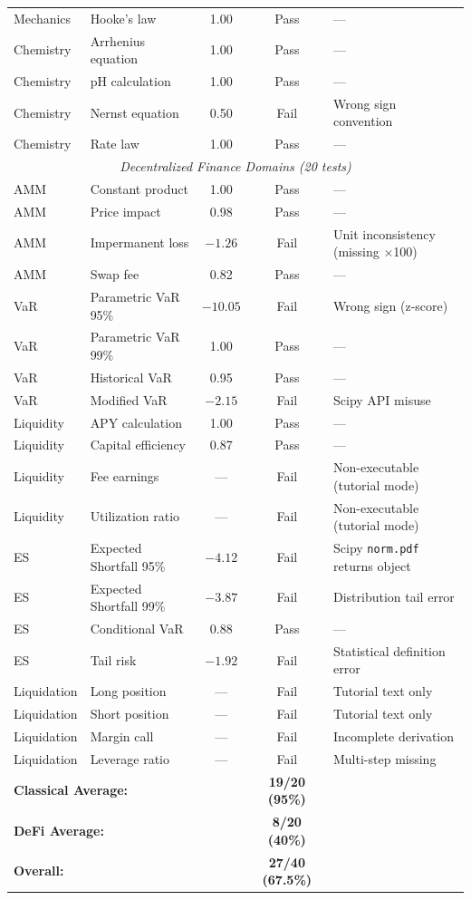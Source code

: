 \documentclass[twoside,11pt]{article}
\begin{document}
\begin{table}[H]
\begin{small}
\begin{tabular}{@{}llccp{5.2cm}@{}}
Mechanics & Hooke's law & 1.00 & Pass & --- \\
Chemistry & Arrhenius equation & 1.00 & Pass & --- \\
Chemistry & pH calculation & 1.00 & Pass & --- \\
Chemistry & Nernst equation & 0.50 & Fail & Wrong sign convention \\
Chemistry & Rate law & 1.00 & Pass & --- \\
\midrule
\multicolumn{5}{c}{\textit{Decentralized Finance Domains (20 tests)}} \\
\midrule
AMM & Constant product & 1.00 & Pass & --- \\
AMM & Price impact & 0.98 & Pass & --- \\
AMM & Impermanent loss & $-1.26$ & Fail & Unit inconsistency (missing $\times$100) \\
AMM & Swap fee & 0.82 & Pass & --- \\
VaR & Parametric VaR 95\% & $-10.05$ & Fail & Wrong sign (z-score) \\
VaR & Parametric VaR 99\% & 1.00 & Pass & --- \\
VaR & Historical VaR & 0.95 & Pass & --- \\
VaR & Modified VaR & $-2.15$ & Fail & Scipy API misuse \\
Liquidity & APY calculation & 1.00 & Pass & --- \\
Liquidity & Capital efficiency & 0.87 & Pass & --- \\
Liquidity & Fee earnings & --- & Fail & Non-executable (tutorial mode) \\
Liquidity & Utilization ratio & --- & Fail & Non-executable (tutorial mode) \\
ES & Expected Shortfall 95\% & $-4.12$ & Fail & Scipy \texttt{norm.pdf} returns object \\
ES & Expected Shortfall 99\% & $-3.87$ & Fail & Distribution tail error \\
ES & Conditional VaR & 0.88 & Pass & --- \\
ES & Tail risk & $-1.92$ & Fail & Statistical definition error \\
Liquidation & Long position & --- & Fail & Tutorial text only \\
Liquidation & Short position & --- & Fail & Tutorial text only \\
Liquidation & Margin call & --- & Fail & Incomplete derivation \\
Liquidation & Leverage ratio & --- & Fail & Multi-step missing \\
\midrule
\multicolumn{3}{l}{\textbf{Classical Average:}} & \textbf{19/20 (95\%)} & \\
\multicolumn{3}{l}{\textbf{DeFi Average:}} & \textbf{8/20 (40\%)} & \\
\multicolumn{3}{l}{\textbf{Overall:}} & \textbf{27/40 (67.5\%)} & \\
\bottomrule
\end{tabular}
\end{small}
\end{table}
\end{document}

